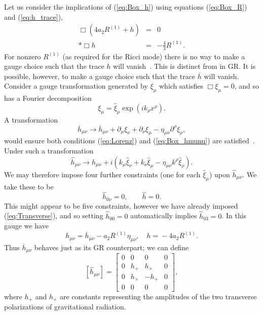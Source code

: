 \documentclass[aps,prd,amsfonts,amssymb,amsmath,nofootinbib,reprint,showpacs]{revtex4-1}
\newcommand{\eqnref}[1]{(\ref{eq:#1})}
\begin{document}
Let us consider the implications of \eqnref{Box_h} using equations \eqnref{Box_R} and \eqnref{h_trace},
\begin{eqnarray}
\Box\left(4a_2R^{(1)} + h\right) & = & 0 \nonumber \\*
\Box h & = & -\frac{4}{3}R^{(1)}.
\end{eqnarray}
For nonzero $R^{(1)}$ (as required for the Ricci mode) there is no way to make a gauge choice such that the trace $h$ will vanish~\cite{Corda2008, Capozziello2008}. This is distinct from in GR. It is possible, however, to make a gauge choice such that the trace $\overline{h}$ will vanish. Consider a gauge transformation generated by $\xi_\mu$ which satisfies $\Box \xi_\mu = 0$, and so has a Fourier decomposition
\begin{equation}
\xi_\mu = \widehat{\xi}_\mu \exp\left(ik_\rho x^\rho\right).
\end{equation}
A transformation
\begin{equation}
\overline{h}_{\mu\nu} \rightarrow \overline{h}_{\mu\nu} + \partial_\mu\xi_\nu + \partial_\nu\xi_\mu - \eta_{\mu\nu}\partial^\rho\xi_\rho,
\end{equation}
would ensure both conditions \eqnref{Lorenz} and \eqnref{Box_hmunu} are satisfied~\cite{Misner1973}. Under such a transformation
\begin{equation}
\widehat{h}_{\mu\nu} \rightarrow \widehat{h}_{\mu\nu} + i\left(k_\mu\widehat{\xi}_\nu + k_\nu\widehat{\xi}_\mu - \eta_{\mu\nu}k^\rho\widehat{\xi}_\rho\right).
\end{equation}
We may therefore impose four further constraints (one for each $\widehat{\xi}_\mu$) upon $\widehat{h}_{\mu\nu}$. We take these to be
\begin{equation}
\widehat{h}_{0\nu} = 0, \qquad \widehat{h} = 0.
\end{equation}
This might appear to be five constraints, however we have already imposed \eqnref{Transverse}, and so setting $\widehat{h}_{00} = 0$ automatically implies $\widehat{h}_{03} = 0$. In this gauge we have
\begin{equation}
h_{\mu\nu} = {} \overline{h}_{\mu\nu} - a_2 R^{(1)}\eta_{\mu\nu}, \quad h = {} -4a_2R^{(1)}.
\label{eq:gauge}
\end{equation}
Thus $\overline{h}_{\mu\nu}$ behaves just as its GR counterpart; we can define
\begin{equation}
\left[\widehat{h}_{\mu\nu}\right] =
\begin{bmatrix}
0 & 0 & 0 & 0\\
0 & h_+ & h_\times & 0\\
0 & h_\times & -h_+ & 0\\
0 & 0 & 0 & 0
\end{bmatrix},
\end{equation}
where $h_+$ and $h_\times$ are constants representing the amplitudes of the two transverse polarizations of gravitational radiation.
\end{document}
